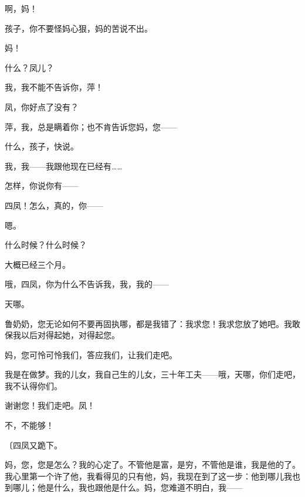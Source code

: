 啊，妈！

孩子，你不要怪妈心狠，妈的苦说不出。

妈！

什么？凤儿？

我，我不能不告诉你，萍！

凤，你好点了没有？

萍，我，总是瞒着你；也不肯告诉您妈，您——

什么，孩子，快说。

我，我——我跟他现在已经有……

怎样，你说你有——

四凤！怎么，真的，你——

嗯。

什么时候？什么时候？

大概已经三个月。

哦，四凤，你为什么不告诉我，我，我的——

天哪。

鲁奶奶，您无论如何不要再固执哪，都是我错了：我求您！我求您放了她吧。我敢保我以后对得起她，对得起您。

妈，您可怜可怜我们，答应我们，让我们走吧。

我是在做梦。我的儿女，我自己生的儿女，三十年工夫——哦，天哪，你们走吧，我不认得你们。

谢谢您！我们走吧。凤！

不，不能够！

{\fangsong〔四凤又跪下。}

妈，您，您是怎么？我的心定了。不管他是富，是穷，不管他是谁，我是他的了。我心里第一个许了他，我看得见的只有他，妈，我现在到了这一步：他到哪儿我也到哪儿；他是什么，我也跟他是什么。妈，您难道不明白，我——

